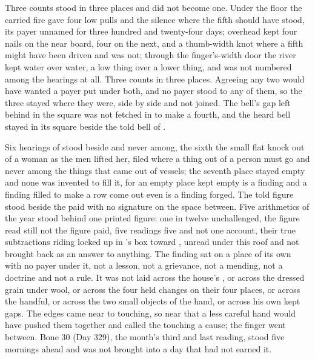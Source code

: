 \scenebreak

Three counts stood in three places and did not become one. Under the floor the carried fire gave four low pulls and the silence where the fifth should have stood, its payer unnamed for three hundred and twenty-four days; overhead  kept four nails on the near board, four on the next, and a thumb-width knot where a fifth might have been driven and was not; through the finger's-width door the river kept water over water, a low thing over a lower thing, and was not numbered among the hearings at all. Three counts in three places. Agreeing any two would have wanted a payer put under both, and no payer stood to any of them, so the three stayed where they were, side by side and not joined. The bell's gap left behind in the square was not fetched in to make a fourth, and the heard bell stayed in its square beside the told bell of .

Six hearings of  stood beside and never among, the sixth the small flat knock out of a woman as the men lifted her, filed where a thing out of a person must go and never among the things that came out of vessels; the seventh place stayed empty and none was invented to fill it, for an empty place kept empty is a finding and a finding filled to make a row come out even is a finding forged. The told figure stood beside the paid with no signature on the space between. Five arithmetics of the year stood behind one printed figure: one in twelve unchallenged, the figure read still not the figure paid, five readings five and not one account, their true subtractions riding locked up  in 's box toward , unread under this roof and not brought back as an answer to anything. The finding sat on a place of its own with no payer under it, not a lesson, not a grievance, not a mending, not a doctrine and not a rule. It was not laid across the house's , or across the dressed grain under wool, or across the four held changes on their four places, or across the handful, or across the two small objects of the hand, or across his own kept gaps. The edges came near to touching, so near that a less careful hand would have pushed them together and called the touching a cause; the finger went between. Bone 30 (Day 329), the month's third and last reading, stood five mornings ahead and was not brought into a day that had not earned it.

